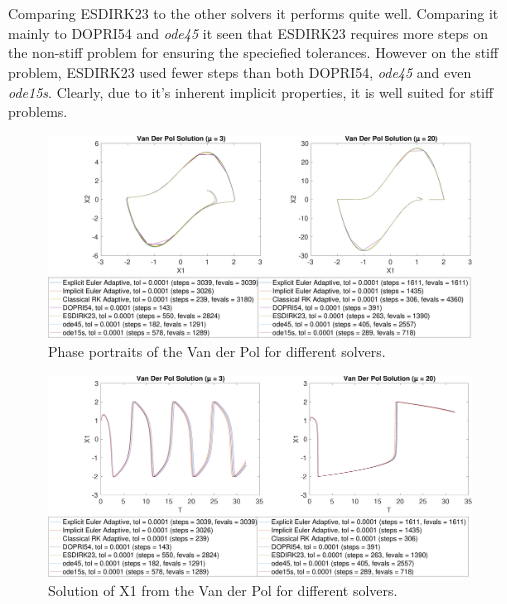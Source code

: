 \\\

Comparing ESDIRK23 to the other solvers it performs quite well. Comparing it mainly to DOPRI54 and \textit{ode45} it seen that ESDIRK23 requires more steps on the non-stiff problem for ensuring the speciefied tolerances. However on the stiff problem, ESDIRK23 used fewer steps than both DOPRI54, \textit{ode45} and even \textit{ode15s}. Clearly, due to it's inherent implicit properties, it is well suited for stiff problems.


\begin{figure}[h]
    \centering
    \includegraphics[width=\textwidth]{plots/7_5b.pdf}
    \caption{Phase portraits of the Van der Pol for different solvers.}
    \label{fig:7_5pp}
\end{figure}

\begin{figure}[h]
    \centering
    \includegraphics[width=\textwidth]{plots/7_5_X1.pdf}
    \caption{Solution of X1 from the Van der Pol for different solvers.}
    \label{fig:7_5x1}
\end{figure}

